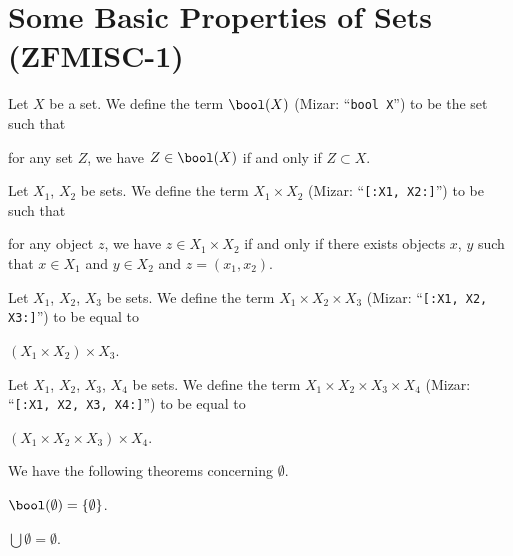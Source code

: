 \section{Some Basic Properties of Sets (ZFMISC-1)}

\begin{definition}
Let $X$ be a set.
We define the term $\bool(X)$ (Mizar: ``\verb#bool X#'') to be the set such that
\begin{defn}
\item for any set $Z$, we have $Z\in\bool(X)$ if and only if $Z\subset X$.
\end{defn}
\end{definition}

\begin{definition}
Let $X_{1}$, $X_{2}$ be sets.
We define the term $X_{1}\times X_{2}$ (Mizar:
``\verb#[:X1, X2:]#'') to be such that
\begin{defn}
\item for any object $z$, we have $z\in X_{1}\times X_{2}$ if and only
  if there exists objects $x$, $y$ such that $x\in X_{1}$ and $y\in X_{2}$ and $z=(x_{1},x_{2})$.
\end{defn}
\end{definition}

\begin{definition}
Let $X_{1}$, $X_{2}$, $X_{3}$ be sets.
We define the term $X_{1}\times X_{2}\times X_{3}$ (Mizar:
``\verb#[:X1, X2, X3:]#'') to be equal to
\begin{defn}
\item $(X_{1}\times X_{2})\times X_{3}$.
\end{defn}
\end{definition}

\begin{definition}
Let $X_{1}$, $X_{2}$, $X_{3}$, $X_{4}$ be sets.
We define the term $X_{1}\times X_{2}\times X_{3}\times X_{4}$ (Mizar:
``\verb#[:X1, X2, X3, X4:]#'') to be equal to
\begin{defn}
\item $(X_{1}\times X_{2}\times X_{3})\times X_{4}$.
\end{defn}
\end{definition}

We have the following theorems concerning $\emptyset$.
\begin{thm}
\item\label{zfmisc1:1} $\bool(\emptyset)=\{\emptyset\}$.
\item\label{zfmisc1:2} $\bigcup\emptyset=\emptyset$.
\end{thm}